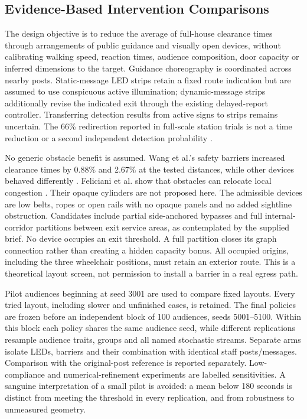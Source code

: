 \documentclass[11pt,a4paper]{article}
\begin{document}
\subsection{Evidence-Based Intervention Comparisons}\label{sec:study-design}

The design objective is to reduce the average of full-house clearance times through arrangements of public guidance and visually open devices, without calibrating walking speed, reaction times, audience composition, door capacity or inferred dimensions to the target. Guidance choreography is coordinated across nearby posts. Static-message LED strips retain a fixed route indication but are assumed to use conspicuous active illumination; dynamic-message strips additionally revise the indicated exit through the existing delayed-report controller. Transferring detection results from active signs to strips remains uncertain. The 66\% redirection reported in full-scale station trials is not a time reduction or a second independent detection probability \cite{galea2017}.

No generic obstacle benefit is assumed. Wang et al.'s safety barriers increased clearance times by 0.88\% and 2.67\% at the tested distances, while other devices behaved differently \cite{wang}. Feliciani et al. show that obstacles can relocate local congestion \cite{feliciani}. Their opaque cylinders are not proposed here. The admissible devices are low belts, ropes or open rails with no opaque panels and no added sightline obstruction. Candidates include partial side-anchored bypasses and full internal-corridor partitions between exit service areas, as contemplated by the supplied brief. No device occupies an exit threshold. A full partition closes its graph connection rather than creating a hidden capacity bonus. All occupied origins, including the three wheelchair positions, must retain an exterior route. This is a theoretical layout screen, not permission to install a barrier in a real egress path.

Pilot audiences beginning at seed 3001 are used to compare fixed layouts. Every tried layout, including slower and unfinished cases, is retained. The final policies are frozen before an independent block of 100 audiences, seeds 5001--5100. Within this block each policy shares the same audience seed, while different replications resample audience traits, groups and all named stochastic streams. Separate arms isolate LEDs, barriers and their combination with identical staff posts/messages. Comparison with the original-post reference is reported separately. Low-compliance and numerical-refinement experiments are labelled sensitivities. A sanguine interpretation of a small pilot is avoided: a mean below 180 seconds is distinct from meeting the threshold in every replication, and from robustness to unmeasured geometry.
\end{document}
